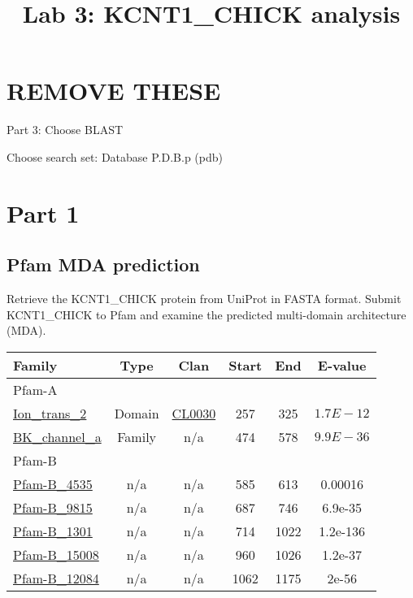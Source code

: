 \documentclass[11pt]{article}
\title{Lab 3: KCNT1\_CHICK analysis}
\author{\Name}%
\begin{document}
\maketitle

\section*{REMOVE THESE}

Part 3: Choose BLAST

Choose search set: Database P.D.B.p (pdb)

\section*{Part 1}

\subsection*{Pfam MDA prediction}

Retrieve the KCNT1\_CHICK protein from UniProt in FASTA format. 
Submit KCNT1\_CHICK to Pfam and examine the predicted multi-domain architecture (MDA). 

\begin{tabular}{| l || c | c | c | c | c |}
\hline
{\bf Family} & {\bf Type} & {\bf Clan} & {\bf Start} & {\bf End} & {\bf E-value} \\
\hline
Pfam-A &&&&&\\ \hline
\href{http://pfam.sanger.ac.uk/family/PF07885.11}{Ion\_trans\_2} & Domain & \href{http://pfam.sanger.ac.uk/clan/CL0030}{CL0030} & 257 & 325 & $1.7E-12$ \\ \hline
\href{http://pfam.sanger.ac.uk/family/PF03493.13}{BK\_channel\_a} & Family & n/a & 474 & 578 & $9.9E-36$ \\ \hline
Pfam-B &&&&&\\ \hline
\href{http://pfam.sanger.ac.uk/pfamb/PB004535}{Pfam-B\_4535} & n/a & n/a & 585 & 613 & 0.00016 \\ \hline
\href{http://pfam.sanger.ac.uk/pfamb/PB009815}{Pfam-B\_9815} & n/a & n/a & 687 & 746 & 6.9e-35 \\ \hline
\href{http://pfam.sanger.ac.uk/pfamb/PB001301}{Pfam-B\_1301} & n/a & n/a & 714 & 1022 & 1.2e-136\\ \hline
\href{http://pfam.sanger.ac.uk/pfamb/PB015008}{Pfam-B\_15008} & n/a & n/a & 960 & 1026 & 1.2e-37\\ \hline
\href{http://pfam.sanger.ac.uk/pfamb/PB012084}{Pfam-B\_12084} & n/a & n/a & 1062 & 1175 & 2e-56\\ \hline
\end{tabular}
\end{document}

